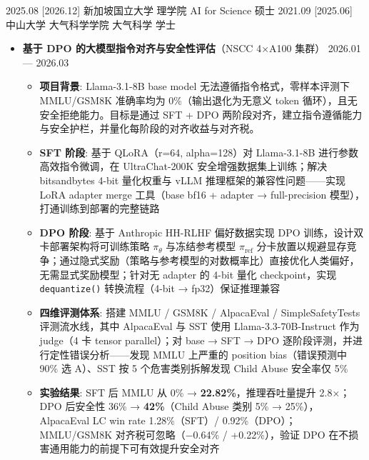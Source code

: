 \documentclass[zh]{resume}
\begin{document}
\makeheader

\begin{educations}
  \education%
    {2025.08}%
    [2026.12]%
    {新加坡国立大学}%
    {理学院}%
    {AI for Science}%
    {硕士}
  \separator{0.5ex}
  \education%
    {2021.09}%
    [2025.06]%
    {中山大学}%
    {大气科学学院}%
    {大气科学}%
    {学士}
\end{educations}

\begin{itemize}
    \item \textbf{基于 DPO 的大模型指令对齐与安全性评估}（NSCC 4×A100 集群） \hfill 2026.01 --- 2026.03
    \begin{itemize}
        \item \textbf{项目背景}: Llama-3.1-8B base model 无法遵循指令格式，零样本评测下 MMLU/GSM8K 准确率均为 0\%（输出退化为无意义 token 循环），且无安全拒绝能力。目标是通过 SFT + DPO 两阶段对齐，建立指令遵循能力与安全护栏，并量化每阶段的对齐收益与对齐税。
        \item \textbf{SFT 阶段}: 基于 QLoRA（r=64, alpha=128）对 Llama-3.1-8B 进行参数高效指令微调，在 UltraChat-200K 安全增强数据集上训练；解决 bitsandbytes 4-bit 量化权重与 vLLM 推理框架的兼容性问题——实现 LoRA adapter merge 工具（base bf16 + adapter → full-precision 模型），打通训练到部署的完整链路
        \item \textbf{DPO 阶段}: 基于 Anthropic HH-RLHF 偏好数据实现 DPO 训练，设计双卡部署架构将可训练策略 $\pi_{\theta}$ 与冻结参考模型 $\pi_{\mathrm{ref}}$ 分卡放置以规避显存竞争；通过隐式奖励（策略与参考模型的对数概率比）直接优化人类偏好，无需显式奖励模型；针对无 adapter 的 4-bit 量化 checkpoint，实现 \texttt{dequantize()} 转换流程（4-bit → fp32）保证推理兼容
        \item \textbf{四维评测体系}: 搭建 MMLU / GSM8K / AlpacaEval / SimpleSafetyTests 评测流水线，其中 AlpacaEval 与 SST 使用 Llama-3.3-70B-Instruct 作为 judge（4 卡 tensor parallel）；对 base → SFT → DPO 逐阶段评测，并进行定性错误分析——发现 MMLU 上严重的 position bias（错误预测中 90\% 选 A）、SST 按 5 个危害类别拆解发现 Child Abuse 安全率仅 5\%
        \item \textbf{实验结果}: SFT 后 MMLU 从 0\% → \textbf{22.82\%}，推理吞吐量提升 2.8×；DPO 后安全性 36\% → \textbf{42\%}（Child Abuse 类别 5\% → 25\%），AlpacaEval LC win rate 1.28\%（SFT）/ 0.92\%（DPO）；MMLU/GSM8K 对齐税可忽略（−0.64\% / +0.22\%），验证 DPO 在不损害通用能力的前提下可有效提升安全对齐

\end{itemize}
\end{itemize}
\end{document}
